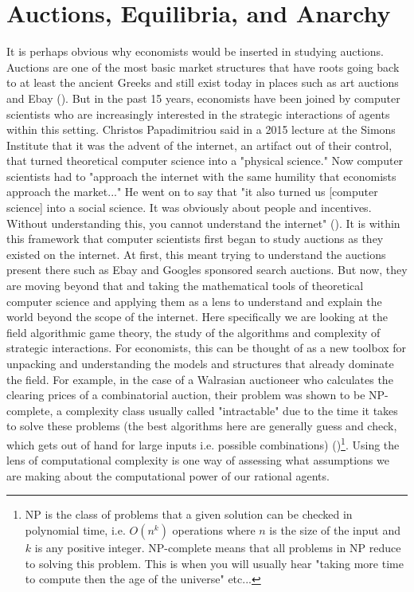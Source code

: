 \documentclass[12pt,twoside]{reedthesis}
\begin{document}
\section{Auctions, Equilibria, and Anarchy}
It is perhaps obvious why economists would be inserted in studying auctions. Auctions are one of the most basic market structures that have roots going back to at least the ancient Greeks and still exist today in places such as art auctions and Ebay (\cite{Mochon2015}). But in the past 15 years, economists have been joined by computer scientists who are increasingly interested in the strategic interactions of agents within this setting. Christos Papadimitriou said in a 2015 lecture at the Simons Institute that it was the advent of the internet, an artifact out of their control, that turned theoretical computer science into a "physical science." Now computer scientists had to "approach the internet with the same humility that economists approach the market..." He went on to say that "it also turned us [computer science] into a social science. It was obviously about people and incentives. Without understanding this, you cannot understand the internet" (\cite{Papadimitriou2015}). It is within this framework that computer scientists first began to study auctions as they existed on the internet. At first, this meant trying to understand the auctions present there such as Ebay and Googles sponsored search auctions. But now, they are moving beyond that and taking the mathematical tools of theoretical computer science and applying them as a lens to understand and explain the world beyond the scope of the internet. Here specifically we are looking at the field algorithmic game theory, the study of the algorithms and complexity of strategic interactions. For economists, this can be thought of as a new toolbox for unpacking and understanding the models and structures that already dominate the field. For example, in the case of a Walrasian auctioneer who calculates the clearing prices of a combinatorial auction, their problem was shown to be NP-complete, a complexity class usually called "intractable" due to the time it takes to solve these problems (the best algorithms here are generally guess and check, which gets out of hand for large inputs i.e. possible combinations) (\cite{Papadimitriou2015})\footnote{NP is the class of problems that a given solution can be checked in polynomial time, i.e. $O(n^k)$ operations where $n$ is the size of the input and $k$ is any positive integer. NP-complete means that all problems in NP reduce to solving this problem. This is when you will usually hear "taking more time to compute then the age of the universe" etc...}. Using the lens of computational complexity is one way of assessing what assumptions we are making about the computational power of our rational agents.
\end{document}
